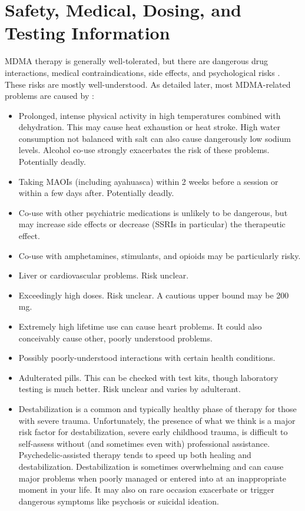 \documentclass[12pt,letterpaper]{book}
\begin{document}
\section{Safety, Medical, Dosing, and Testing Information}
\label{sec:safety}
MDMA therapy is generally well-tolerated, but there are dangerous drug interactions, medical contraindications, side effects, and psychological risks \cite{wolfgang2025}. These risks are mostly well-understood. As detailed later, most MDMA-related problems are caused by \cite{wolfgang2025,riggDeaths,roxburghDeaths}:
\begin{itemize}
    \item Prolonged, intense physical activity in high temperatures combined with dehydration. This may cause heat exhaustion or heat stroke. High water consumption not balanced with salt can also cause dangerously low sodium levels. Alcohol co-use strongly exacerbates the risk of these problems. Potentially deadly.
    \item Taking MAOIs (including ayahuasca) within 2 weeks before a session or within a few days after. Potentially deadly.
    \item Co-use with other psychiatric medications is unlikely to be dangerous, but may increase side effects or decrease (SSRIs in particular) the therapeutic effect.
    \item Co-use with amphetamines, stimulants, and opioids may be particularly risky.
    \item Liver or cardiovascular problems. Risk unclear.
    \item Exceedingly high doses. Risk unclear. A cautious upper bound may be 200 mg.
    \item Extremely high lifetime use can cause heart problems. It could also conceivably cause other, poorly understood problems.
    \item Possibly poorly-understood interactions with certain health conditions.
    \item Adulterated pills. This can be checked with test kits, though laboratory testing is much better. Risk unclear and varies by adulterant.
    \item Destabilization is a common and typically healthy phase of therapy for those with severe trauma. Unfortunately, the presence of what we think is a major risk factor for destabilization, severe early childhood trauma, is difficult to self-assess without (and sometimes even with) professional assistance. Psychedelic-assisted therapy tends to speed up both healing and destabilization. Destabilization is sometimes overwhelming and can cause major problems when poorly managed or entered into at an inappropriate moment in your life. It may also on rare occasion exacerbate or trigger dangerous symptoms like psychosis or suicidal ideation.
\end{itemize}
\end{document}
